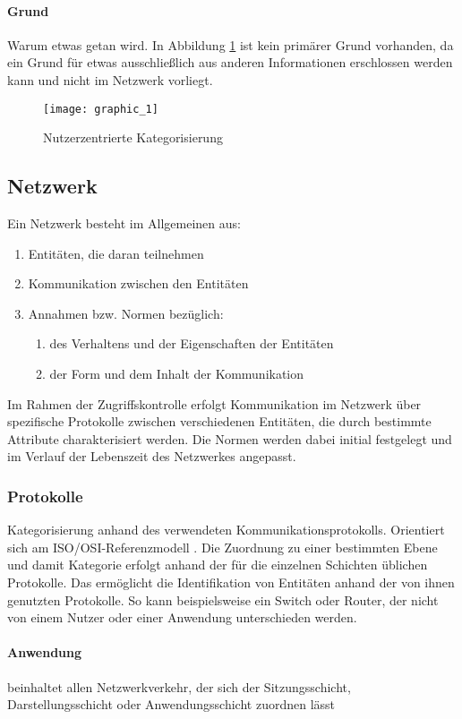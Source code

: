 \paragraph{Grund}
Warum etwas getan wird. In  Abbildung \ref{Tax_1}  ist kein primärer Grund vorhanden, da ein Grund für etwas ausschließlich aus anderen Informationen erschlossen werden kann und nicht im Netzwerk vorliegt.
\begin{figure}[H]
\label{Tax_1}
\centering
\texttt{[image: graphic\_1]}
\caption{Nutzerzentrierte Kategorisierung}
\end{figure}
\subsection{Netzwerk}
Ein Netzwerk besteht im Allgemeinen aus:
\begin{enumerate}
\item{Entitäten, die daran teilnehmen}
\item{Kommunikation zwischen den Entitäten}
\item{Annahmen bzw. Normen bezüglich:}
\begin{enumerate}
	\item{des Verhaltens und der Eigenschaften der Entitäten}
	\item{der Form und dem Inhalt der Kommunikation}
\end{enumerate}
\end{enumerate}
Im Rahmen der Zugriffskontrolle erfolgt Kommunikation im Netzwerk über spezifische Protokolle zwischen verschiedenen Entitäten, die durch bestimmte Attribute charakterisiert werden. Die Normen werden dabei initial festgelegt und im Verlauf der Lebenszeit des Netzwerkes angepasst.
\subsubsection{Protokolle}
Kategorisierung anhand des verwendeten Kommunikationsprotokolls. Orientiert sich am ISO/OSI-Referenzmodell \cite{day1983osi}. Die Zuordnung zu einer bestimmten Ebene und damit Kategorie erfolgt anhand der für die einzelnen Schichten üblichen Protokolle. Das ermöglicht die Identifikation von Entitäten anhand der von ihnen genutzten Protokolle. So kann beispielsweise ein Switch oder Router, der nicht von einem Nutzer oder einer Anwendung unterschieden werden.
\paragraph{Anwendung}
beinhaltet allen Netzwerkverkehr, der sich der Sitzungsschicht, Darstellungsschicht oder Anwendungsschicht zuordnen lässt 
